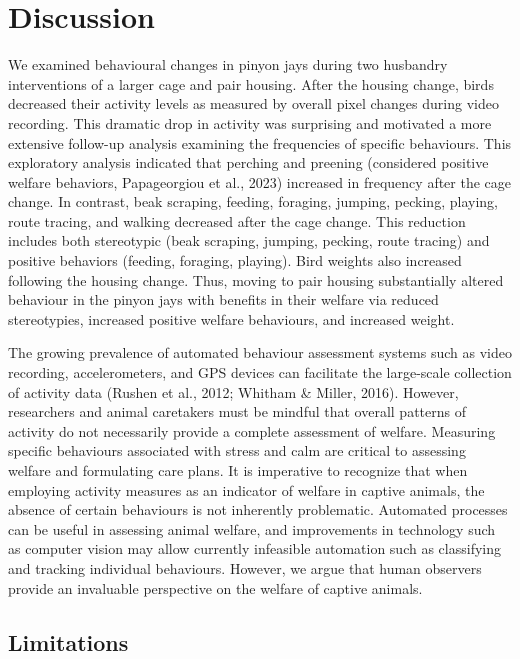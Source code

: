 \documentclass[
  pub]{apa6}
\begin{document}
\section{Discussion}\label{discussion}

We examined behavioural changes in pinyon jays during two husbandry interventions of a larger cage and pair housing. After the housing change, birds decreased their activity levels as measured by overall pixel changes during video recording. This dramatic drop in activity was surprising and motivated a more extensive follow-up analysis examining the frequencies of specific behaviours. This exploratory analysis indicated that perching and preening (considered positive welfare behaviors, Papageorgiou et al., 2023) increased in frequency after the cage change. In contrast, beak scraping, feeding, foraging, jumping, pecking, playing, route tracing, and walking decreased after the cage change. This reduction includes both stereotypic (beak scraping, jumping, pecking, route tracing) and positive behaviors (feeding, foraging, playing). Bird weights also increased following the housing change. Thus, moving to pair housing substantially altered behaviour in the pinyon jays with benefits in their welfare via reduced stereotypies, increased positive welfare behaviours, and increased weight.

The growing prevalence of automated behaviour assessment systems such as video recording, accelerometers, and GPS devices can facilitate the large-scale collection of activity data (Rushen et al., 2012; Whitham \& Miller, 2016). However, researchers and animal caretakers must be mindful that overall patterns of activity do not necessarily provide a complete assessment of welfare. Measuring specific behaviours associated with stress and calm are critical to assessing welfare and formulating care plans. It is imperative to recognize that when employing activity measures as an indicator of welfare in captive animals, the absence of certain behaviours is not inherently problematic. Automated processes can be useful in assessing animal welfare, and improvements in technology such as computer vision may allow currently infeasible automation such as classifying and tracking individual behaviours. However, we argue that human observers provide an invaluable perspective on the welfare of captive animals.

\subsection{Limitations}\label{limitations}
\end{document}
